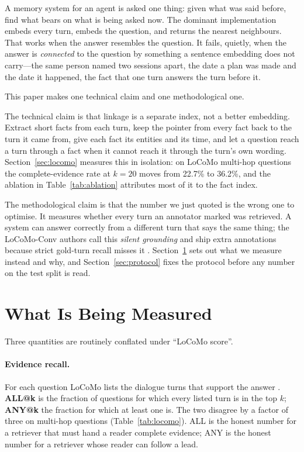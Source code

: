\documentclass[11pt]{article}
\begin{document}
A memory system for an agent is asked one thing: given what was said before,
find what bears on what is being asked now. The dominant implementation
embeds every turn, embeds the question, and returns the nearest neighbours.
That works when the answer resembles the question. It fails, quietly, when the
answer is \emph{connected} to the question by something a sentence embedding
does not carry---the same person named two sessions apart, the date a plan
was made and the date it happened, the fact that one turn answers the turn
before it.

This paper makes one technical claim and one methodological one.

The technical claim is that linkage is a separate index, not a better
embedding. Extract short facts from each turn, keep the pointer from every
fact back to the turn it came from, give each fact its entities and its time,
and let a question reach a turn through a fact when it cannot reach it
through the turn's own wording. Section~\ref{sec:locomo} measures this in
isolation: on LoCoMo multi-hop questions the complete-evidence rate at $k=20$
moves from 22.7\% to 36.2\%, and the ablation in Table~\ref{tab:ablation}
attributes most of it to the fact index.

The methodological claim is that the number we just quoted is the wrong one
to optimise. It measures whether every turn an annotator marked was
retrieved. A system can answer correctly from a different turn that says the
same thing; the LoCoMo-Conv authors call this \emph{silent grounding} and
ship extra annotations because strict gold-turn recall misses it
\cite{locomoconv}. Section~\ref{sec:measure} sets out what we measure instead
and why, and Section~\ref{sec:protocol} fixes the protocol before any number
on the test split is read.

\section{What Is Being Measured}
\label{sec:measure}

Three quantities are routinely conflated under ``LoCoMo score''.

\paragraph{Evidence recall.} For each question LoCoMo lists the dialogue
turns that support the answer \cite{locomo}. \textbf{ALL@k} is the fraction
of questions for which every listed turn is in the top $k$; \textbf{ANY@k}
the fraction for which at least one is. The two disagree by a factor of
three on multi-hop questions (Table~\ref{tab:locomo}). ALL is the honest
number for a retriever that must hand a reader complete evidence; ANY is the
honest number for a retriever whose reader can follow a lead.
\end{document}
